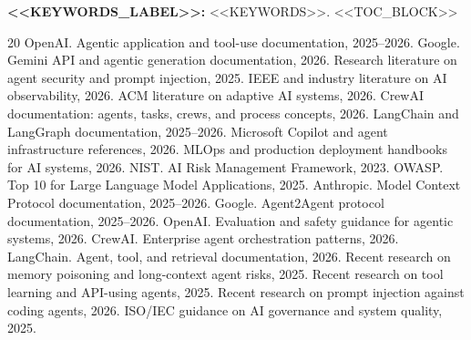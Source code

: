 \textbf{<<KEYWORDS_LABEL>>:} <<KEYWORDS>>.
\clearpage
<<TOC_BLOCK>>

\begin{thebibliography}{20}
 OpenAI. Agentic application and tool-use documentation, 2025--2026.
 Google. Gemini API and agentic generation documentation, 2026.
 Research literature on agent security and prompt injection, 2025.
 IEEE and industry literature on AI observability, 2026.
 ACM literature on adaptive AI systems, 2026.
 CrewAI documentation: agents, tasks, crews, and process concepts, 2026.
 LangChain and LangGraph documentation, 2025--2026.
 Microsoft Copilot and agent infrastructure references, 2026.
 MLOps and production deployment handbooks for AI systems, 2026.
 NIST. AI Risk Management Framework, 2023.
 OWASP. Top 10 for Large Language Model Applications, 2025.
 Anthropic. Model Context Protocol documentation, 2025--2026.
 Google. Agent2Agent protocol documentation, 2025--2026.
 OpenAI. Evaluation and safety guidance for agentic systems, 2026.
 CrewAI. Enterprise agent orchestration patterns, 2026.
 LangChain. Agent, tool, and retrieval documentation, 2026.
 Recent research on memory poisoning and long-context agent risks, 2025.
 Recent research on tool learning and API-using agents, 2025.
 Recent research on prompt injection against coding agents, 2026.
 ISO/IEC guidance on AI governance and system quality, 2025.
\end{thebibliography}

